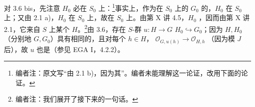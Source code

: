 对 3.6 bis，先注意 $H_0$ 必在 $S_0$ 上：\footnote{编者注：原文写“由 2.1 b)，因为其”。编者未能理解这一论证，改用下面的论证。}事实上，作为在 $S_0$ 上的 $G_0$ 的，$H_0$ 在 $S_0$ 上；又由 2.1 a)，$H_0$ 在 $S_0$ 上，故在 $S_0$ 上。由第 X 讲 4.5，$H_0$ ，因而由第 X 讲 2.1，它来自 $S$ 上某个 $H$。\footnote{编者注：我们展开了接下来的一句话。}由 3.6，存在 $S$-群 $u:H\to G$  $H_0\hookrightarrow G_0$；因为 $H,H_0$（分别地 $G,G_0$）具有相同的，且对每个 $h\in H$，
$\mathcal O_{G,u(h)}\to\mathcal O_{H,h}$ （因为模 $J$ 后），故 $u$ 也是（参见 EGA I，4.2.2）。

